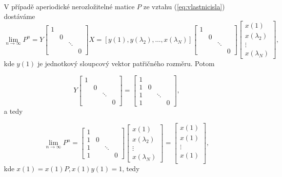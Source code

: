\documentclass[10pt]{article}
\begin{document}
V případě aperiodické nerozložitelné matice $P$ ze vztahu (\ref{eq:vlastnicisla}) dostáváme
\begin{equation}
\lim_{n \to \infty} P^n = Y \begin{bmatrix}
1&&&\\
&0&&\\
&&\ddots&\\
&&&0
\end{bmatrix}X=
[y(1),y(\lambda_2),\dots,x(\lambda_N)]
\begin{bmatrix}
1&&&\\
&0&&\\
&&\ddots&\\
&&&0
\end{bmatrix}
\begin{bmatrix}
x(1)\\
x(\lambda_2)\\
\vdots\\
x(\lambda_N)
\end{bmatrix},
\end{equation} kde $y(1)$ je jednotkový sloupcový vektor patřičného rozměru. Potom

\begin{equation}
Y \begin{bmatrix}
1&&&\\
&0&&\\
&&\ddots&\\
&&&0
\end{bmatrix}=
\begin{bmatrix}
1&&&\\
1&0&&\\
1&&\ddots&\\
1&&&0
\end{bmatrix},
\end{equation} a tedy

\begin{equation}
\lim_{n \to \infty} P^n =
\begin{bmatrix}
1&&&\\
1&0&&\\
1&&\ddots&\\
1&&&0
\end{bmatrix}
\begin{bmatrix}
x(1)\\
x(\lambda_2)\\
\vdots\\
x(\lambda_N)
\end{bmatrix} = \begin{bmatrix}
x(1)\\
x(1)\\
\vdots\\
x(1)\\
\end{bmatrix},
\end{equation} kde $x(1)=x(1)P, x(1)y(1)=1$, tedy 
\end{document}
